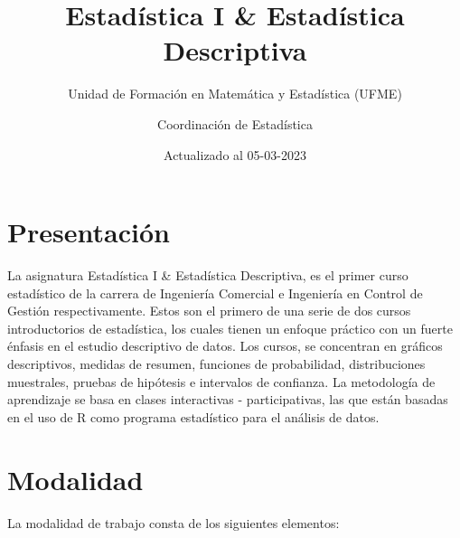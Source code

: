 \documentclass[
]{book}
\title{Estadística I \& Estadística Descriptiva}
\subtitle{Unidad de Formación en Matemática y Estadística (UFME)}
\author{Coordinación de Estadística}
\date{Actualizado al 05-03-2023}
\theoremstyle{definition}
\theoremstyle{definition}
\theoremstyle{definition}
\theoremstyle{definition}
\theoremstyle{remark}
\begin{document}
\maketitle

{
\setcounter{tocdepth}{2}
\tableofcontents
}
\hypertarget{presentaciuxf3n}{%
\chapter*{Presentación}\label{presentaciuxf3n}}

La asignatura Estadística I \& Estadística Descriptiva, es el primer curso estadístico de la carrera de Ingeniería Comercial e Ingeniería en Control de Gestión respectivamente. Estos son el primero de una serie de dos cursos introductorios de estadística, los cuales tienen un enfoque práctico con un fuerte énfasis en el estudio descriptivo de datos. Los cursos, se concentran en gráficos descriptivos, medidas de resumen, funciones de probabilidad, distribuciones muestrales, pruebas de hipótesis e intervalos de confianza. La metodología de aprendizaje se basa en clases interactivas - participativas, las que están basadas en el uso de R como programa estadístico para el análisis de datos.

\hypertarget{modalidad}{%
\chapter*{Modalidad}\label{modalidad}}

La modalidad de trabajo consta de los siguientes elementos:
\end{document}
